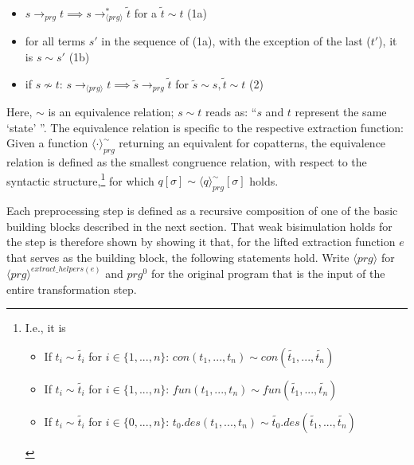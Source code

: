 \begin{itemize}
\item $s \longrightarrow_{prg} t \implies s  \longrightarrow^*_{\langle prg \rangle} \tilde{t}$ for a $\tilde{t} \sim t$ (1a)

\item for all terms $s'$ in the sequence of (1a), with the exception of the last ($t'$), it is $s \sim s'$ (1b)

\item if $s \not\sim t$: $s \longrightarrow_{\langle prg \rangle} t \implies \tilde{s} \longrightarrow_{prg} \tilde{t}$ for $\tilde{s} \sim s, \tilde{t} \sim t$ (2)

\end{itemize}

Here, $\sim$ is an equivalence relation; $s \sim t$ reads as: ``$s$ and $t$ represent the same `state' ''. The equivalence relation is specific to the respective extraction function: Given a function $\langle \cdot \rangle^{\sim}_{prg}$ returning an equivalent for copatterns, the equivalence relation is defined as the smallest congruence relation, with respect to the syntactic structure,\footnote{I.e., it is
\begin{itemize}

\item If $t_i \sim \widetilde{t_i}$ for $i \in \{1, ..., n\}$: $con(t_1, ..., t_n) \sim con(\widetilde{t_1}, ..., \widetilde{t_n})$

\item If $t_i \sim \widetilde{t_i}$ for $i \in \{1, ..., n\}$: $fun(t_1, ..., t_n) \sim fun(\widetilde{t_1}, ..., \widetilde{t_n})$

\item If $t_i \sim \widetilde{t_i}$ for $i \in \{0, ..., n\}$: $t_0.des(t_1, ..., t_n) \sim \widetilde{t_0}.des(\widetilde{t_1}, ..., \widetilde{t_n})$ 

\end{itemize}} for which $q[\sigma] \sim \langle q \rangle^{\sim}_{prg}[\sigma]$ holds.

Each preprocessing step is defined as a recursive composition of one of the basic building blocks described in the next section. That weak bisimulation holds for the step is therefore shown by showing it that, for the lifted extraction function $e$ that serves as the building block, the following statements hold. Write $\langle prg \rangle$ for $\langle prg \rangle^{extract\_helpers(e)}$ and $prg^0$ for the original program that is the input of the entire transformation step.

